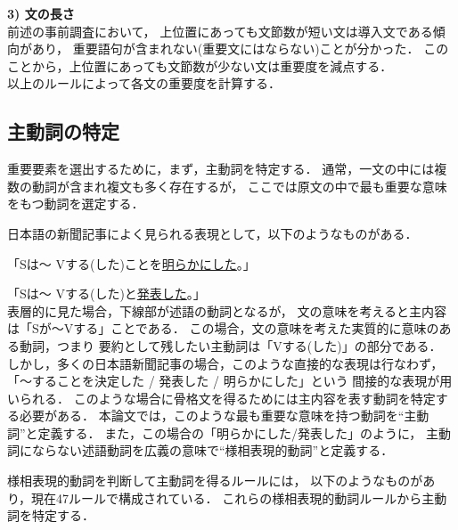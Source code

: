 \vspace{1mm}
{\bf 3) 文の長さ}\\
前述の事前調査において，
上位置にあっても文節数が短い文は導入文である傾向があり，
重要語句が含まれない(重要文にはならない)ことが分かった．
このことから，上位置にあっても文節数が少ない文は重要度を減点する．\\

以上のルールによって各文の重要度を計算する．

\subsection{主動詞の特定}

重要要素を選出するために，まず，主動詞を特定する．
通常，一文の中には複数の動詞が含まれ複文も多く存在するが，
ここでは原文の中で最も重要な意味をもつ動詞を選定する．

日本語の新聞記事によく見られる表現として，以下のようなものがある．

\vspace{3mm}
「Sは〜 Vする(した)ことを\underline{明らかにした}。」

「Sは〜 Vする(した)と\underline{発表した}。」
\vspace{3mm}\\
表層的に見た場合，下線部が述語の動詞となるが，
文の意味を考えると主内容は「Sが〜Vする」ことである．
この場合，文の意味を考えた実質的に意味のある動詞，つまり
要約として残したい主動詞は「Vする(した)」の部分である．
しかし，多くの日本語新聞記事の場合，このような直接的な表現は行なわず，
「〜することを決定した / 発表した / 明らかにした」という
間接的な表現が用いられる．
このような場合に骨格文を得るためには主内容を表す動詞を特定する必要がある．
本論文では，このような最も重要な意味を持つ動詞を``主動詞''と定義する．
また，この場合の「明らかにした/発表した」のように，
主動詞にならない述語動詞を広義の意味で``様相表現的動詞''と定義する．

様相表現的動詞を判断して主動詞を得るルールには，
以下のようなものがあり，現在47ルールで構成されている．
これらの様相表現的動詞ルールから主動詞を特定する．

